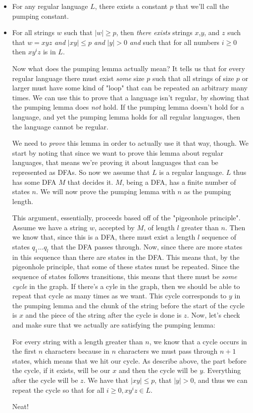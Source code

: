 \documentclass[11pt]{article}
\begin{document}
\begin{itemize}
\item For any regular language $L$, there exists a constant $p$ that we'll call the pumping constant.
\item For all strings $w$ such that $|w| \geq p$, then \emph{there exists} strings $x$,$y$, and $z$ such that $w = xyz$ \emph{and} $|xy| \le p$ \emph{and} $|y| > 0$ \emph{and} such that for all numbers $i \geq 0$ then $xy^iz$ is in $L$.

Now what does the pumping lemma actually mean? It tells us that for every regular language there must exist \emph{some} size $p$ such that all strings of size $p$ or larger must have some kind of "loop" that can be repeated an arbitrary many times. We can use this to prove that a language isn't regular, by showing that the pumping lemma does \emph{not} hold. If the pumping lemma doesn't hold for a language, and yet the pumping lemma holds for all regular languages, then the language cannot be regular.

We need to \emph{prove} this lemma in order to actually use it that way, though. We start by noting that since we want to prove this lemma about regular languages, that means we're proving it about languages that can be represented as DFAs. So now we assume that $L$ is a regular language. $L$ thus has some DFA $M$ that decides it. $M$, being a DFA, has a finite number of states $n$. We will now prove the pumping lemma with $n$ as the pumping length. 

This argument, essentially, proceeds based off of the "pigeonhole principle". Assume we have a string $w$, accepted by $M$, of length $l$ greater than $n$. Then we know that, since this is a DFA, there must exist a length $l$ sequence of states $q_1 \ldots q_l$ that the DFA passes through. Now, since there are more states in this sequence than there are states in the DFA. This means that, by the pigeonhole principle, that some of these states must be repeated. Since the sequence of states follows transitions, this means that there must be \emph{some cycle} in the graph. If there's a cyle in the graph, then we should be able to repeat that cycle as many times as we want. This cycle corresponds to $y$ in the pumping lemma and the chunk of the string before the start of the cycle is $x$ and the piece of the string after the cycle is done is $z$. Now, let's check and make sure that we actually are satisfying the pumping lemma:

For every string with a length greater than $n$, we know that a cycle occurs in the first $n$ characters because in $n$ characters we must pass through $n+1$ states, which means that we hit our cycle. As describe above, the part before the cycle, if it exists, will be our $x$ and then the cycle will be $y$. Everything after the cycle will be $z$. We have that $|xy| \leq p$, that $|y| > 0$, and thus we can repeat the cycle so that for all $i \geq 0, xy^iz \in L$.

Neat!
\end{itemize}
\end{document}
